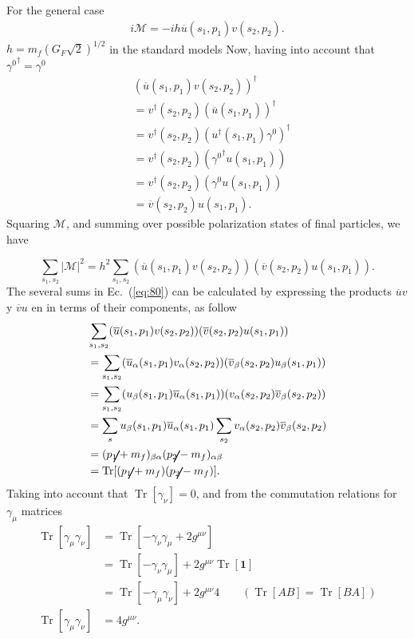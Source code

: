 For the general case
\begin{align}
i\mathcal{M}=-i h\overline{u}(s_1,p_{1})v(s_2, p_{2}). 
\end{align}
$h=m_{f}\left(G_{F}\sqrt{2}\right)^{1/2}$ in the standard models
Now, having into account that ${\gamma^{0}}^{\dag}=\gamma^{0}$
\begin{align*}
&(\overline{u}(s_1,p_{1})v(s_2, p_{2}))^{\dag}\\
&=v^{\dag}(s_2, p_{2})(\overline{u}(s_1,p_{1}))^{\dag}\\
&=v^{\dag}(s_2, p_{2})({u^{\dag}}(s_1,p_{1}){\gamma^{0}})^{\dag}\\
&=v^{\dag}(s_2, p_{2})({\gamma^{0}}^{\dag}u(s_1,p_{1}))\\
&=v^{\dag}(s_2, p_{2})(\gamma^{0}u(s_1,p_{1}))\\
&=\overline{v}(s_2,p_{2})u(s_1,p_{1}). 
\end{align*}
Squaring  $\mathcal{M}$,  and summing over possible polarization states of final particles, we have

\begin{equation}
\sum_{s_1,s_2}|\mathcal{M}|^{2}=h^2\sum_{s_1,s_2}(\overline{u}(s_1,p_{1})v(s_2,
p_{2}))(\overline{v}(s_2,p_{2})u(s_1,p_{1})). \label{eq:80}
\end{equation}
The several sums in Ec.~(\ref{eq:80}) can be calculated by expressing the products  $\overline{u}v$ y $\overline{v}u$ en in terms of their components, as follow
\begin{align}
\label{eq:81}
&\sum_{s_1,s_2}(\overline{u}(s_1,p_{1})v(s_2, p_{2}))(\overline{v}(s_2,p_{2})u(s_1,p_{1}))\nonumber\\
&=\sum_{s_1,s_2}(\overline{u}_{\alpha}(s_1,p_{1})v_{\alpha}(s_2, p_{2}))(\overline{v}_{\beta}(s_2,p_{2})u_{\beta}(s_1,p_{1}))\nonumber\\
&=\sum_{s_1,s_2}(u_{\beta}(s_1,p_{1})\overline{u}_{\alpha}(s_1,p_{1}))(v_{\alpha}(s_2, p_{2})\overline{v}_{\beta}(s_2,p_{2}))\nonumber\\
&=\sum_{s}u_{\beta}(s_1,p_{1})\overline{u}_{\alpha}(s_1,p_{1})\sum_{s_2}v_{\alpha}(s_2, p_{2})\overline{v}_{\beta}(s_2,p_{2})\nonumber\\
&=(\cancel{p}_{1}+m_{f})_{\beta\alpha}(\cancel{p}_{2}-m_{f})_{\alpha\beta}\nonumber\\
&=\operatorname{Tr}[(\cancel{p}_{1}+m_{f})(\cancel{p}_{2}-m_{f})]. 
\end{align}
Taking into account that  $\operatorname{Tr}[\gamma_{\nu}]=0$, and from the commutation relations for $\gamma_\mu$ matrices
\begin{align*}
\operatorname{Tr}[\gamma_{\mu}\gamma_{\nu}]&=\operatorname{Tr}[-\gamma_{\nu}\gamma_{\mu}+2g^{\mu\nu}]\\
&=\operatorname{Tr}[-\gamma_{\nu}\gamma_{\mu}]+2g^{\mu\nu}\operatorname{Tr}[\mathbf{1}]\\
&=\operatorname{Tr}[-\gamma_{\mu}\gamma_{\nu}]+2g^{\mu\nu}4 \qquad (\operatorname{Tr}[AB]=\operatorname{Tr}[BA])\\
\operatorname{Tr}[\gamma_{\mu}\gamma_{\nu}]&=4g^{\mu\nu}.
\end{align*}

